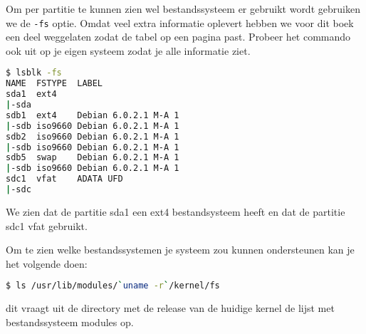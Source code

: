 Om per partitie te kunnen zien wel bestandssysteem er gebruikt wordt gebruiken we de \texttt{-fs} optie. Omdat veel extra informatie oplevert hebben we voor dit boek een deel weggelaten zodat de tabel op een pagina past. Probeer het commando ook uit op je eigen systeem zodat je alle informatie ziet.
\begin{lstlisting}[language=bash]
$ lsblk -fs
NAME  FSTYPE  LABEL                
sda1  ext4                         
|-sda                                                                                  
sdb1  ext4    Debian 6.0.2.1 M-A 1 
|-sdb iso9660 Debian 6.0.2.1 M-A 1 
sdb2  iso9660 Debian 6.0.2.1 M-A 1 
|-sdb iso9660 Debian 6.0.2.1 M-A 1 
sdb5  swap    Debian 6.0.2.1 M-A 1 
|-sdb iso9660 Debian 6.0.2.1 M-A 1 
sdc1  vfat    ADATA UFD            
|-sdc
\end{lstlisting}
We zien dat de partitie sda1 een ext4 bestandsysteem heeft en dat de partitie sdc1 vfat gebruikt.

Om te zien welke bestandssystemen je systeem zou kunnen ondersteunen kan je het volgende doen:
\begin{lstlisting}[language=bash]
$ ls /usr/lib/modules/`uname -r`/kernel/fs
\end{lstlisting}
dit vraagt uit de directory met de release van de huidige kernel de lijst met bestandssysteem modules op.
